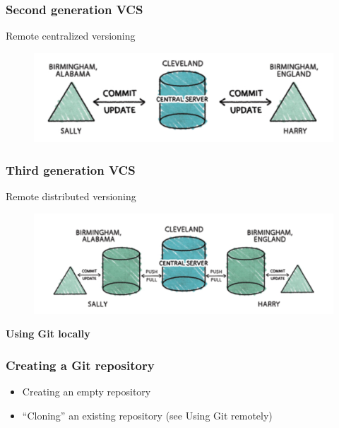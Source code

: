\documentclass{beamer}
\begin{document}
\begin{frame}
\frametitle{Second generation VCS}
Remote centralized versioning


\begin{figure}
\includegraphics[scale=0.3]{figures/f1.png}
\end{figure}


\end{frame}

\begin{frame}
\frametitle{Third generation VCS}
Remote distributed versioning


\begin{figure}
\includegraphics[scale=0.28]{figures/f2.png}
\end{figure}

\end{frame}


\begin{frame}

\LARGE	
\textbf{Using Git locally}


\end{frame}


\begin{frame}
\frametitle{Creating a Git repository}

\begin{itemize}
\item Creating an empty repository 
\item ``Cloning'' an existing repository (see Using Git remotely)
\end{itemize}

\end{frame}
\end{document}
